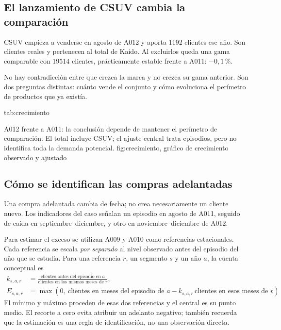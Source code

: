 \subsection{El lanzamiento de CSUV cambia la comparación}
CSUV empieza a venderse en agosto de A012 y aporta \num{1192} clientes ese año.
Son clientes reales y pertenecen al total de Kaido. Al excluirlos queda una gama
comparable con \num{19514} clientes, prácticamente estable frente a A011:
$-0{,}1\,\%$.

No hay contradicción entre que crezca la marca y no crezca su gama anterior. Son
dos preguntas distintas: cuánto vende el conjunto y cómo evoluciona el perímetro
de productos que ya existía.

{tab:crecimiento}{}

{A012 frente a A011: la conclusión depende de mantener el perímetro de comparación.
El total incluye CSUV; el ajuste central trata episodios, pero no identifica toda
la demanda potencial.}
{fig:crecimiento}{, gráfico de crecimiento observado y ajustado}

\subsection{Cómo se identifican las compras adelantadas}
Una compra adelantada cambia de fecha; no crea necesariamente un cliente nuevo.
Los indicadores del caso señalan un episodio en agosto de A011, seguido de caída
en septiembre--diciembre, y otro en noviembre--diciembre de A012.

Para estimar el exceso se utilizan A009 y A010 como referencias estacionales.
Cada referencia se escala \emph{por separado} al nivel observado antes del
episodio del año que se estudia. Para una referencia $r$, un segmento $s$ y un
año $a$, la cuenta conceptual es
\begin{align}
 k_{s,a,r}&=\frac{\text{clientes antes del episodio en }a}
                  {\text{clientes en los mismos meses de }r},\\
 E_{s,a,r}&=\max\!\left(0,\ \text{clientes en meses del episodio de }a
                 -k_{s,a,r}\,\text{clientes en esos meses de }r\right).
\end{align}
El mínimo y máximo proceden de esas dos referencias y el central es su punto
medio. El recorte a cero evita atribuir un adelanto negativo; también recuerda que
la estimación es una regla de identificación, no una observación directa.

